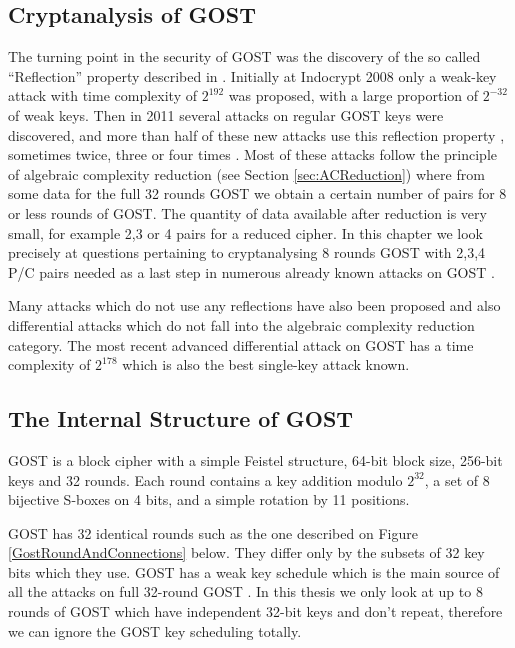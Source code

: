 \subsection{Cryptanalysis of GOST} \label{sec:CrytanalysisGOST}

The turning point in the security of GOST was the discovery of the so called
``Reflection'' property described in \cite{GOSTReflectionKara}.
Initially at Indocrypt 2008 only a weak-key attack with time complexity of $2^{192}$ was proposed, with a large proportion of $2^{-32}$ of weak keys. Then in 2011 several attacks on regular GOST keys were discovered, and more than half of these new attacks use this reflection property \cite{JapaneseGOSTMITMFSE2011,DunkelmanImprovedGOST8R}, sometimes twice, three or four times \cite{gostac}. Most of these attacks follow the principle of algebraic complexity reduction (see Section \ref{sec:ACReduction}) where from some data for the full 32 rounds GOST we obtain a certain number
of pairs for 8 or less rounds of GOST. The quantity of data available after reduction is very small,
for example 2,3 or 4 pairs for a reduced cipher. In this chapter we look precisely at questions pertaining to cryptanalysing 8 rounds GOST with 2,3,4 P/C pairs needed as a last step in numerous already known attacks on GOST \cite{gostreport,gostac,gostlow8r}.

Many attacks which do not use any reflections
have also been proposed \cite{gostac,gostreport,DunkelmanImprovedGOST8R}
and also differential attacks which do not
fall into the algebraic complexity reduction category.
The most recent advanced differential attack on GOST
has a time complexity of $2^{178}$ \cite{gostdc0,gostdc2}
which is also the best single-key attack known.

\subsection{The Internal Structure of GOST}
GOST is a block cipher with a simple Feistel structure,
64-bit block size, 256-bit keys and 32 rounds.
Each round contains a key addition modulo $2^{32}$,
a set of 8 bijective S-boxes on 4 bits,
and a simple rotation by 11 positions.

GOST has 32 identical rounds such as the one described on Figure \ref{GostRoundAndConnections} below.
They differ only by the subsets of 32 key bits which they use. GOST has a weak key schedule which is the main source of all the attacks on full 32-round GOST \cite{gostreport,gostac,JapaneseGOSTMITMFSE2011,gostdcpp1,gostdc0,gostdc1,gostdc2,DunkelmanImprovedGOST8R}.  
In this thesis we only look at up to 8 rounds of GOST which have independent 32-bit keys and don't repeat, therefore we can ignore the GOST key scheduling totally.

